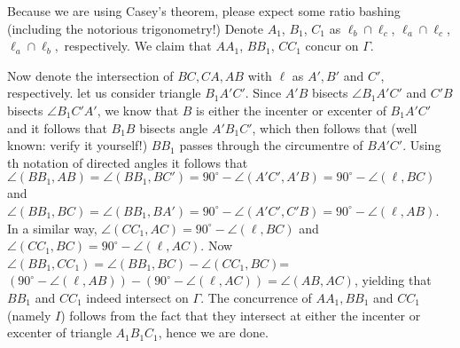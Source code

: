 \documentclass[11pt,a4paper]{article}
\begin{document}
\begin{enumerate}
	
	Because we are using Casey's theorem, please expect some ratio bashing (including the notorious trigonometry!) Denote $A_1$, $B_1$, $C_1$ as $\ell_b\cap \ell_c$, $\ell_a\cap \ell_c$, $\ell_a\cap \ell_b,$ respectively. We claim that $AA_1$, $BB_1$, $CC_1$ concur on $\Gamma$.
	
	Now denote the intersection of $BC, CA, AB$ with $\ell$ as $A',B'$ and $C'$, respectively. let us consider triangle $B_1A'C'$. Since $A'B$ bisects $\angle B_1A'C'$ and $C'B$ bisects $\angle B_1C'A'$, we know that $B$ is either the incenter or excenter of $B_1A'C'$ and it follows that $B_1B$ bisects angle $A'B_1C'$, which then follows that (well known: verify it yourself!) $BB_1$ passes through the circumentre of $BA'C'$. Using th notation of directed angles it follows that $\angle (BB_1,AB)=\angle (BB_1,BC')=90^{\circ}-\angle (A'C',A'B)=90^{\circ}-\angle (\ell, BC)$ and $\angle (BB_1,BC)=\angle (BB_1,BA')=90^{\circ}-\angle (A'C',C'B)=90^{\circ}-\angle (\ell,AB)$. In a similar way, $\angle (CC_1,AC)=90^{\circ}-\angle (\ell, BC)$ and $\angle (CC_1,BC)=90^{\circ}-\angle (\ell, AC).$ Now $\angle (BB_1,CC_1)=\angle (BB_1, BC)-\angle (CC_1, BC)$=$(90^{\circ}-\angle (\ell,AB))-(90^{\circ}-\angle (\ell,AC))=\angle (AB, AC)$, yielding that $BB_1$ and $CC_1$ indeed intersect on $\Gamma$. The concurrence of $AA_1, BB_1$ and $CC_1$ (namely $I$) follows from the fact that they intersect at either the incenter or excenter of triangle $A_1B_1C_1$, hence we are done.
	

\end{enumerate}
\end{document}
